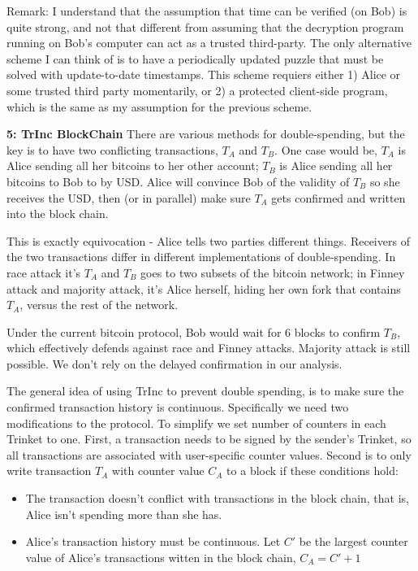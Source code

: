 \documentclass[10pt]{article}
\newcommand\question[2]{\vspace{.1in}\textbf{#1: #2}\vspace{.5em}\vspace{.10in}}
\begin{document}
Remark: I understand that the assumption that time can be verified (on Bob) is
quite strong, and not that different from assuming that the decryption program
running on Bob's computer can act as a trusted third-party. The only alternative
scheme I can think of is to have a periodically updated puzzle that must be
solved with update-to-date timestamps. This scheme requiers either 1) Alice or
some trusted third party momentarily, or 2) a protected client-side program,
which is the same as my assumption for the previous scheme.


\newpage
\question{5}{TrInc BlockChain}
There are various methods for double-spending, but the key is to have two
conflicting transactions, $T_A$ and $T_B$. One case would be, $T_A$ is Alice
sending all her bitcoins to her other account; $T_B$ is Alice sending all her
bitcoins to Bob to by USD. Alice will convince Bob of the validity of $T_B$ so
she receives the USD, then (or in parallel) make sure $T_A$ gets confirmed and
written into the block chain.

This is exactly equivocation - Alice tells two parties different things.
Receivers of the two transactions differ in different implementations of
double-spending. In race attack it's $T_A$ and $T_B$ goes to two subsets of the
bitcoin network; in Finney attack and majority attack, it's Alice herself,
hiding her own fork that contains $T_A$, versus the rest of the network.

Under the current bitcoin protocol, Bob would wait for 6 blocks to confirm
$T_B$, which effectively defends against race and Finney attacks. Majority
attack is still possible. We don't rely on the delayed confirmation in our
analysis.

The general idea of using TrInc to prevent double spending, is to make sure the
confirmed transaction history is continuous. Specifically we need two
modifications to the protocol. To simplify we set number of counters in each
Trinket to one. First, a transaction needs to be signed by the sender's Trinket,
so all transactions are associated with user-specific counter values.
Second is to only write transaction $T_A$ with counter value $C_A$
to a block if these conditions hold:
\begin{itemize}
    \item The transaction doesn't conflict with transactions in the block chain,
        that is, Alice isn't spending more than she has.
    \item Alice's transaction history must be continuous. Let $C'$ be the
        largest counter value of Alice's transactions witten in the block chain,
        $C_A = C' + 1$
\end{itemize}
\end{document}
